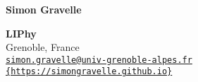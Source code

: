 \documentclass[a4paper,11pt]{concours}
\begin{document}
 \arrayrulewidth=1mm


\noindent \begin{minipage}{0.58\linewidth}
\vspace{-0.4cm}
{\Huge\textbf{Simon Gravelle}}\\

\vspace{-0.2cm}
\noindent {{\textcolor{new_gray1}{\LARGE Physicist in soft matter \\
and fluids at interfaces}}}
\end{minipage}
\begin{minipage}{0.412\linewidth} 
	\begin{flushright}
\textbf{LIPhy}\\
\textcolor{new_gray1}{Grenoble, France\\
\href{mailto:simon.gravelle@univ-grenoble-alpes.fr}{{\color{blue_1}\nolinkurl{simon.gravelle@univ-grenoble-alpes.fr}}}\\
\href{https://simongravelle.github.io}{\color{blue_1}\nolinkurl{{https://simongravelle.github.io}}}\\
}
	\end{flushright}
\end{minipage}

\vspace{2.2cm}
\end{document}
